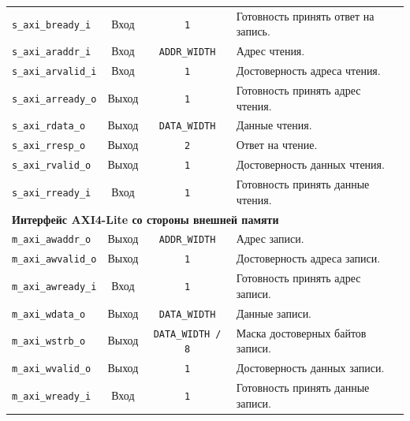 \begin{table}[H]
\begin{tabularx}{\textwidth}{l c c X}
		\verb|s_axi_bready_i| &
		Вход &
		\verb|1| &
		Готовность принять ответ на запись. \\
		
		\verb|s_axi_araddr_i| &
		Вход &
		\verb|ADDR_WIDTH| &
		Адрес чтения. \\
		
		\verb|s_axi_arvalid_i| &
		Вход &
		\verb|1| &
		Достоверность адреса чтения. \\
		
		\verb|s_axi_arready_o| &
		Выход &
		\verb|1| &
		Готовность принять адрес чтения. \\
		
		\verb|s_axi_rdata_o| &
		Выход &
		\verb|DATA_WIDTH| &
		Данные чтения. \\
		
		\verb|s_axi_rresp_o| &
		Выход &
		\verb|2| &
		Ответ на чтение. \\
		
		\verb|s_axi_rvalid_o| &
		Выход &
		\verb|1| &
		Достоверность данных чтения. \\
		
		\verb|s_axi_rready_i| &
		Вход &
		\verb|1| &
		Готовность принять данные чтения. \\
		
		\midrule
		\multicolumn{4}{l}{\textbf{Интерфейс AXI4-Lite со стороны внешней памяти}} \\
		\midrule
		
		\verb|m_axi_awaddr_o| &
		Выход &
		\verb|ADDR_WIDTH| &
		Адрес записи. \\
		
		\verb|m_axi_awvalid_o| &
		Выход &
		\verb|1| &
		Достоверность адреса записи. \\
		
		\verb|m_axi_awready_i| &
		Вход &
		\verb|1| &
		Готовность принять адрес записи. \\
		
		\verb|m_axi_wdata_o| &
		Выход &
		\verb|DATA_WIDTH| &
		Данные записи. \\
		
		\verb|m_axi_wstrb_o| &
		Выход &
		\verb|DATA_WIDTH / 8| &
		Маска достоверных байтов записи. \\
		
		\verb|m_axi_wvalid_o| &
		Выход &
		\verb|1| &
		Достоверность данных записи. \\
		
		\verb|m_axi_wready_i| &
		Вход &
		\verb|1| &
		Готовность принять данные записи. \\
		

\end{tabularx}
\end{table}
